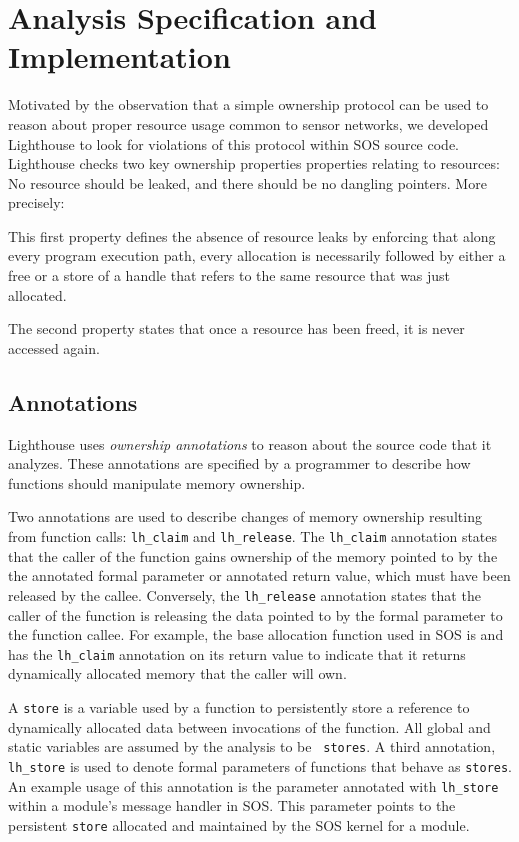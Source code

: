 \section{Analysis Specification and Implementation}
\label{sec:alg}

Motivated by the observation that a simple ownership protocol can be
used to reason about proper resource usage common to sensor networks,
we developed Lighthouse to look for violations of this protocol within
SOS source code.  
%
Lighthouse checks two key ownership properties properties
relating to resources: No resource should be leaked, and there should
be no dangling pointers.  
%
More precisely:

\smallskip{} This first property defines the
absence of resource leaks by enforcing that along every program
execution path, every allocation is necessarily followed by either a
free or a store of a handle that refers to the same resource that was
just allocated.

\smallskip{} The second property
states that once a resource has been freed, it is never accessed
again.


\subsection{Annotations}

Lighthouse uses {\em ownership annotations} to reason about the source
code that it analyzes.  
%
These annotations are specified by a programmer to describe how
functions should manipulate memory ownership.


Two annotations are used to describe changes of memory ownership
resulting from function calls: {\tt lh\_claim} and {\tt lh\_release}.
%
The {\tt lh\_claim} annotation states that the caller of the function
gains ownership of the memory pointed to by the the annotated formal
parameter or annotated return value, which must have been released by
the callee.  
%
Conversely, the {\tt lh\_release} annotation states that the caller of
the function is releasing the data pointed to by the formal parameter
to the function callee.  
%
For example, the base allocation function used in SOS is
 and has the {\tt lh\_claim} annotation on its
return value to indicate that it returns dynamically allocated memory
that the caller will own.


A {\tt store} is a variable used by a function to persistently store a
reference to dynamically allocated data between invocations of the
function.
%
All global and static variables are assumed by the analysis to be {\tt
stores}.
%
A third annotation, {\tt lh\_store} is used to denote formal
parameters of functions that behave as {\tt stores}.
%
An example usage of this annotation is the  parameter
annotated with {\tt lh\_store} within a module's message handler in
SOS.  
%
This parameter points to the persistent {\tt store} allocated and
maintained by the SOS kernel for a module.



